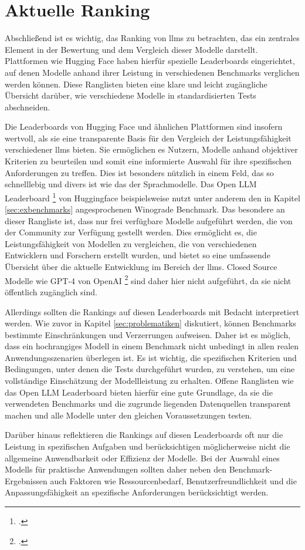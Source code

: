 \section{Aktuelle Ranking} \label{sec:aktuelle_rankings}
Abschließend ist es wichtig, das Ranking von \acp{llm} zu betrachten, das ein zentrales Element in der Bewertung und dem Vergleich dieser Modelle darstellt. Plattformen wie Hugging Face haben hierfür spezielle Leaderboards eingerichtet, auf denen Modelle anhand ihrer Leistung in verschiedenen Benchmarks verglichen werden können. Diese Ranglisten bieten eine klare und leicht zugängliche Übersicht darüber, wie verschiedene Modelle in standardisierten Tests abschneiden.

Die Leaderboards von Hugging Face und ähnlichen Plattformen sind insofern wertvoll, als sie eine transparente Basis für den Vergleich der Leistungsfähigkeit verschiedener \acp{llm} bieten. Sie ermöglichen es Nutzern, Modelle anhand objektiver Kriterien zu beurteilen und somit eine informierte Auswahl für ihre spezifischen Anforderungen zu treffen. Dies ist besonders nützlich in einem Feld, das so schnelllebig und divers ist wie das der Sprachmodelle.
Das Open LLM Leaderboard \footcite[Vgl.][]{open-llm-leaderboard} von Huggingface beispielsweise nutzt unter anderem den in Kapitel \ref{sec:exbenchmarks} angesprochenen Winograde Benchmark.
Das besondere an dieser Rangliste ist, dass nur frei verfügbare Modelle aufgeführt werden, die von der Community zur Verfügung gestellt werden.
Dies ermöglicht es, die Leistungsfähigkeit von Modellen zu vergleichen, die von verschiedenen Entwicklern und Forschern erstellt wurden, und bietet so eine umfassende Übersicht über die aktuelle Entwicklung im Bereich der \acp{llm}.
Closed Source Modelle wie GPT-4 von OpenAI \footcite[Vgl.][S. 1]{openai2023gpt4} sind daher hier nicht aufgeführt, da sie nicht öffentlich zugänglich sind.

Allerdings sollten die Rankings auf diesen Leaderboards mit Bedacht interpretiert werden. Wie zuvor in Kapitel \ref{sec:problematiken} diskutiert, können Benchmarks bestimmte Einschränkungen und Verzerrungen aufweisen.
Daher ist es möglich, dass ein hochrangiges Modell in einem Benchmark nicht unbedingt in allen realen Anwendungsszenarien überlegen ist.
Es ist wichtig, die spezifischen Kriterien und Bedingungen, unter denen die Tests durchgeführt wurden, zu verstehen, um eine vollständige Einschätzung der Modellleistung zu erhalten.
Offene Ranglisten wie das Open LLM Leaderboard bieten hierfür eine gute Grundlage, da sie die verwendeten Benchmarks und die zugrunde liegenden Datenquellen transparent machen und alle Modelle unter den gleichen Voraussetzungen testen.

Darüber hinaus reflektieren die Rankings auf diesen Leaderboards oft nur die Leistung in spezifischen Aufgaben und berücksichtigen möglicherweise nicht die allgemeine Anwendbarkeit oder Effizienz der Modelle.
Bei der Auswahl eines Modells für praktische Anwendungen sollten daher neben den Benchmark-Ergebnissen auch Faktoren wie Ressourcenbedarf, Benutzerfreundlichkeit und die Anpassungsfähigkeit an spezifische Anforderungen berücksichtigt werden.
